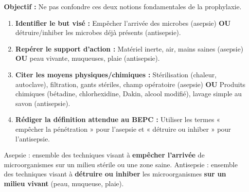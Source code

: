 \documentclass[11pt]{article}
\newcommand{\cle}[1]{{\popxbold\color{popdark}#1}}
\begin{document}
\begin{methode}
    \textbf{Objectif :} Ne pas confondre ces deux notions fondamentales de la prophylaxie.
    \begin{enumerate}
        \item \textbf{Identifier le but visé :} Empêcher l'arrivée des microbes (asepsie) \textbf{OU} détruire/inhiber les microbes déjà présents (antisepsie).
        \item \textbf{Repérer le support d'action :} Matériel inerte, air, mains saines (asepsie) \textbf{OU} peau vivante, muqueuses, plaie (antisepsie).
        \item \textbf{Citer les moyens physiques/chimiques :} Stérilisation (chaleur, autoclave), filtration, gants stériles, champ opératoire (asepsie) \textbf{OU} Produits chimiques (bétadine, chlorhexidine, Dakin, alcool modifié), lavage simple au savon (antisepsie).
        \item \textbf{Rédiger la définition attendue au BEPC :} Utiliser les termes « empêcher la pénétration » pour l'asepsie et « détruire ou inhiber » pour l'antisepsie.
    \end{enumerate}
    \cle{Asepsie} : ensemble des techniques visant à \textbf{empêcher l'arrivée} de microorganismes sur un milieu stérile ou une zone saine. \cle{Antisepsie} : ensemble des techniques visant à \textbf{détruire ou inhiber} les microorganismes \textbf{sur un milieu vivant} (peau, muqueuse, plaie).
\end{methode}
\end{document}
